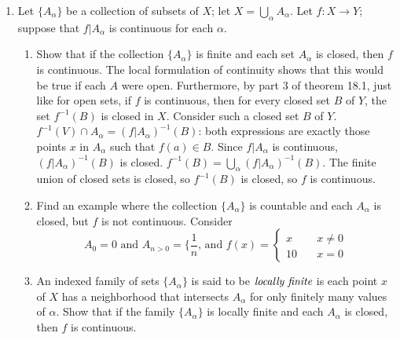 \documentclass[12pt,letterpaper]{article}
\newcommand{\n}{\break}
\begin{document}
\begin{enumerate}
\item Let $\{A_\alpha\}$ be a collection of subsets of $X$; let $X=\bigcup_\alpha A_\alpha$. Let $f: X\rightarrow Y$; suppose that $f|A_\alpha$ is continuous for each $\alpha$. 
\begin{enumerate}
\item Show that if the collection $\{A_\alpha\}$ is finite and each set $A_\alpha$ is closed, then $f$ is continuous.\hspace{5in}\n
\indent The local formulation of continuity shows that this would be true if each $A$ were open. Furthermore, by part 3 of theorem 18.1, just like for open sets, if $f$ is continuous, then for every closed set $B$ of $Y$, the set $f^{-1}(B)$ is closed in $X$. Consider such a closed set $B$ of $Y$. $f^{-1}(V)\cap A_\alpha = (f|A_\alpha)^{-1}(B)$: both expressions are exactly those points $x$ in $A_\alpha$ such that $f(a)\in B$. Since $f|A_\alpha$ is continuous, $(f|A_\alpha)^{-1}(B)$ is closed. $f^{-1}(B) = \bigcup_\alpha(f|A_\alpha)^{-1}(B)$. The finite union of closed sets is closed, so $f^{-1}(B)$ is closed, so $f$ is continuous.
\item Find an example where the collection $\{A_\alpha\}$ is countable and each $A_\alpha$ is closed, but $f$ is not continuous.\hspace{5in}\n
\indent Consider 
$$A_0={0} \text{ and } A_{n>0}=\{\frac{1}{n}\text{, and } f(x)=\begin{cases} x & \quad x\neq 0 \\ 10 & \quad x=0\end{cases}$$
\item An indexed family of sets $\{A_\alpha\}$ is said to be $\emph{locally finite}$ is each point $x$ of $X$ has a neighborhood that intersects $A_\alpha$ for only finitely many values of $\alpha$. Show that if the family $\{A_\alpha\}$ is locally finite and each $A_\alpha$ is closed, then $f$ is continuous.
\end{enumerate}
\end{enumerate}
\end{document}
